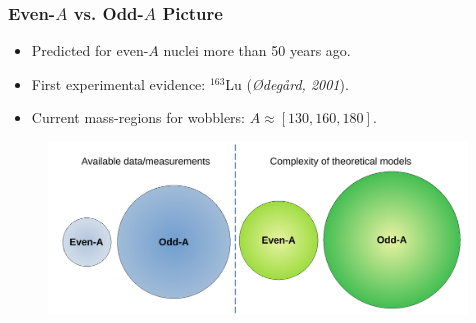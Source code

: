 \documentclass{beamer}
\begin{document}
\begin{frame}
	\frametitle{Even-$A$ vs. Odd-$A$ Picture}
	\begin{itemize}
		\item Predicted for even-$A$ nuclei more than 50 years ago.
		\item First experimental evidence: $^{163}$Lu (\textit{Ødegård, 2001}). %
		\item Current mass-regions for wobblers: $A\approx[130,160,180]$.
	\end{itemize}
	\begin{figure}
		\centering
		\includegraphics[width=0.99\textwidth]{figures/even-vs-odda.pdf}
	\end{figure}
\end{frame}



\end{document}
